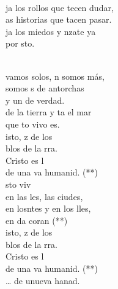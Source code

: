 \documentclass[12pt]{article}
\begin{document}
\begin{multicols*}{2}
\begin{cancion}
	\jump\\
	ja los rollos que tecen dudar,\\
	as historias que tacen pasar.\\
	ja los miedos y nzate ya  \\
	por sto. \\\jump\\
	\begin{chorus}%
	 vamos solos, n somos más,\\
	somos s de antorchas \\
	y un  de verdad.\\
	de la tierra y ta el mar\\
	que to vivo es. \\
\jump
	isto, z de los \\
	blos de la rra.\\
	Cristo es l \\
	de una va humanid. (**)\\
	sto viv\\
	en las les, las ciudes,\\
	en losntes y en los lles,\\
	en da coran (**) \\
	isto, z de los \\
	blos de la rra.\\
	Cristo es l \\
	de una va humanid. (**)\\
	… de unueva hanad.\\
	\end{chorus}%
	\jump\\
\end{cancion}%


\end{multicols*}
\end{document}
